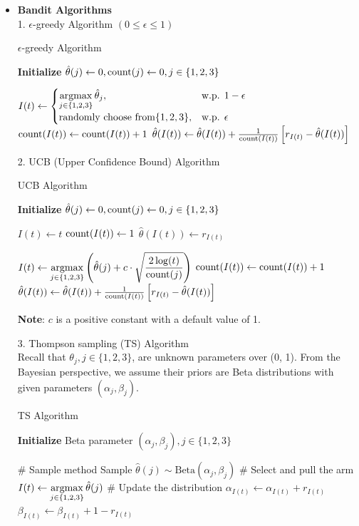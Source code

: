 \begin{itemize}
\item \textbf{Bandit Algorithms} \\
1. $\epsilon$-greedy Algorithm $(0 \leq \epsilon \leq 1)$
\begin{algorithm}[h]
\caption{$\epsilon$-greedy Algorithm}
\textbf{Initialize} $\hat{\theta}(j)\gets 0, \text{count}(j)\gets 0, j \in \{1,2,3\}$
\begin{algorithmic}[1]
        \State $I(t)\gets\begin{cases}
            \mathop{\rm argmax}\limits_{j\in\{1,2,3\}} \hat{\theta}_j, & \text{w.p. } 1-\epsilon \\
            \text{randomly choose from} \{1,2,3\}, & \text{w.p. } \epsilon
            \end{cases}$
        \State $\text{count}(I(t))\gets \text{count}(I(t)) + 1$
        \State $\hat{\theta}(I(t))\gets \hat{\theta}(I(t))+\frac{1}{\text{count}(I(t))} \left[r_{I(t)}-\hat{\theta}(I(t))\right]$
    \EndFor
\end{algorithmic}
\end{algorithm}

2. UCB (Upper Confidence Bound) Algorithm \\
\begin{algorithm}[h]
\caption{UCB Algorithm}
\textbf{Initialize} $\hat{\theta}(j)\gets 0, \text{count}(j)\gets 0, j \in \{1,2,3\}$
\begin{algorithmic}[1]
        \State $I(t)\gets t$
        \State $\text{count}(I(t))\gets 1$
        \State $\hat{\theta}(I(t))\gets r_{I(t)}$
    \EndFor

        \State $I(t)\gets\mathop{\rm argmax}\limits_{j\in\{1,2,3\}} \left(\hat{\theta}(j)+c\cdot \sqrt{\dfrac{2\log(t)}{\text{count}(j)}} \right)$
        \State $\text{count}(I(t))\gets \text{count}(I(t)) + 1$
        \State $\hat{\theta}(I(t))\gets \hat{\theta}(I(t))+\frac{1}{\text{count}(I(t))} \left[r_{I(t)}-\hat{\theta}(I(t))\right]$
    \EndFor
\end{algorithmic}
\end{algorithm}
\textbf{Note}: $c$ is a positive constant with a default value of 1.

3. Thompson sampling (TS) Algorithm \\
Recall that $\theta_j, j\in\{1, 2, 3\}$, are unknown parameters over (0, 1). From the Bayesian perspective, we assume their priors are Beta distributions with given parameters $(\alpha_j, \beta_j)$.
\begin{algorithm}[h]
\caption{TS Algorithm}
\textbf{Initialize} Beta parameter $(\alpha_j,\beta_j), j \in \{1,2,3\}$
\begin{algorithmic}[1]
        \State \# Sample method
            \State Sample $\hat{\theta}(j) \sim \text{Beta}(\alpha_j, \beta_j)$
        \EndFor
        \State \# Select and pull the arm
        \State $I(t)\gets\mathop{\rm argmax}\limits_{j\in\{1,2,3\}} \hat{\theta}(j)$
        \State \# Update the distribution
        \State $\alpha_{I(t)}\gets \alpha_{I(t)} + r_{I(t)}$
        \State $\beta_{I(t)}\gets \beta_{I(t)} + 1 - r_{I(t)}$
    \EndFor
\end{algorithmic}
\end{algorithm}


\end{itemize}

